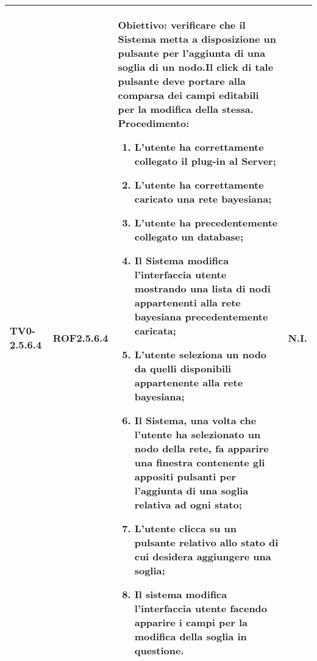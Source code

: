 \begin{longtable}{|C{.15\textwidth}|C{.13\textwidth}|m{.52\textwidth}|C{.08\textwidth}|}
TV0-2.5.6.4 & ROF2.5.6.4  &
	\textbf{Obiettivo}: verificare che il Sistema metta a disposizione un pulsante per l'aggiunta di una soglia di un nodo.Il click di tale pulsante deve portare alla comparsa dei campi editabili per la modifica della stessa. \newline
	\textbf{Procedimento}:
	\begin{enumerate}
		\item L'utente ha correttamente collegato il plug-in al Server;
		\item L'utente ha correttamente caricato una rete bayesiana;
		\item L'utente ha precedentemente collegato un database;
		\item Il Sistema modifica l'interfaccia utente mostrando una lista di nodi appartenenti alla rete bayesiana precedentemente caricata;
		\item L'utente seleziona un nodo da quelli disponibili appartenente alla rete bayesiana;
		\item Il Sistema, una volta che l'utente ha selezionato un nodo della rete, fa apparire una finestra contenente gli appositi pulsanti per l'aggiunta di una soglia relativa ad ogni stato;
		\item L'utente clicca su un pulsante relativo allo stato di cui desidera aggiungere una soglia;
		\item Il sistema modifica l'interfaccia utente facendo apparire i campi per la modifica della soglia in questione.
	\end{enumerate}
	& N.I. \\
\hline


\end{longtable}
